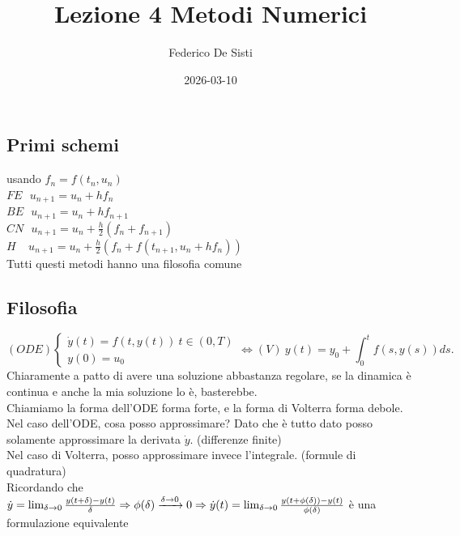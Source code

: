 \documentclass[12px]{article}
\title{Lezione 4 Metodi Numerici}
\date{2026-03-10}
\author{Federico De Sisti}
\begin{document}
\maketitle
	\newpage
	\subsection{Primi schemi}
	usando $f_n = f(t_n,u_n)$\\
	$FE\ \ \ u_{n+1} = u_n + hf_n$\\
	$BE \ \ \ u_{n+1} = u_n + hf_{n+1}$\\
	$CN \ \ \ u_{n+1} = u_n + \frac h 2 (f_n  + f_{n+1})$\\
	$H \ \ \ \ \ u_{n+1} = u_n + \frac h 2 (f_n + f(t_{n+1}, u_n + h f_n))$\\
	Tutti questi metodi hanno una filosofia comune
	\subsection{Filosofia}
	\[
		(ODE) \begin{cases}
		\dot y(t) = f(t,y(t)) \ t\in (0,T)\\
		y(0) = u_0
	\end{cases} \Leftrightarrow (V)\ y(t) = y_0 + \int_0^t f(s,y(s))ds
	.\] 
	Chiaramente a patto di avere una soluzione abbastanza regolare, se la dinamica è continua e anche la mia soluzione lo è, basterebbe.\\
	Chiamiamo la forma dell'ODE forma forte, e la forma di Volterra forma debole.\\

	Nel caso dell'ODE, cosa posso approssimare? Dato che è tutto dato posso solamente approssimare la derivata $\dot y$. (differenze finite)\\

	Nel caso di Volterra, posso approssimare invece l'integrale. (formule di quadratura)\\

	Ricordando che $\dot y = \lim_{\delta \rightarrow 0} \frac{y(t+\delta) - y(t)}{\delta} \\
	\Rightarrow  \phi(\delta) \xrightarrow{\delta \rightarrow 0} 0 \Rightarrow  \dot y(t) = \lim_{\delta \rightarrow 0} \frac{y(t + \phi(\delta)) - y(t) }{\phi(\delta)}$ è una formulazione equivalente\\
	
\end{document}
